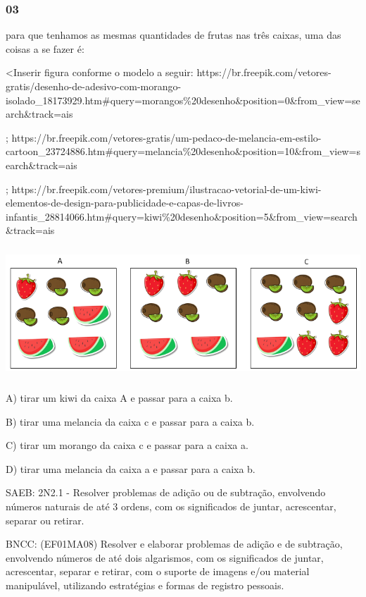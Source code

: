 \begin{itemize}
\begin{itemize}
\subsubsection{03}\label{section-134}

para que tenhamos as mesmas quantidades de frutas nas três caixas, uma
das coisas a se fazer é:

\textless{}Inserir figura conforme o modelo a seguir:
https://br.freepik.com/vetores-gratis/desenho-de-adesivo-com-morango-isolado\_18173929.htm\#query=morangos\%20desenho\&position=0\&from\_view=search\&track=ais

;
https://br.freepik.com/vetores-gratis/um-pedaco-de-melancia-em-estilo-cartoon\_23724886.htm\#query=melancia\%20desenho\&position=10\&from\_view=search\&track=ais

;
https://br.freepik.com/vetores-premium/ilustracao-vetorial-de-um-kiwi-elementos-de-design-para-publicidade-e-capas-de-livros-infantis\_28814066.htm\#query=kiwi\%20desenho\&position=5\&from\_view=search\&track=ais

\includegraphics[width=5.90556in,height=1.93194in]{media/image152.png}

A) tirar um kiwi da caixa A e passar para a caixa b.

B) tirar uma melancia da caixa c e passar para a caixa b.

C) tirar um morango da caixa c e passar para a caixa a.

D) tirar uma melancia da caixa a e passar para a caixa b.

SAEB: 2N2.1 - Resolver problemas de adição ou de subtração, envolvendo
números naturais de até 3 ordens, com os significados de juntar,
acrescentar, separar ou retirar.

BNCC: (EF01MA08) Resolver e elaborar problemas de adição e de subtração,
envolvendo números de até dois algarismos, com os significados de
juntar, acrescentar, separar e retirar, com o suporte de imagens e/ou
material manipulável, utilizando estratégias e formas de registro
pessoais.


\end{itemize}
\end{itemize}
